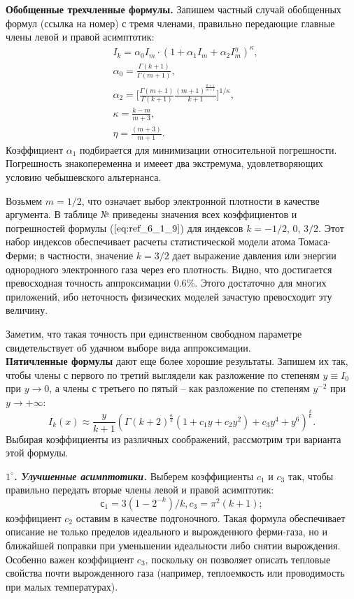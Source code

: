 \textbf{Обобщенные трехчленные формулы.} Запишем частный случай обобщенных формул (ссылка на номер) с тремя членами, правильно передающие главные члены левой и правой асимптотик:
\begin{equation}
\begin{aligned}
&I_k = \alpha_0 I_m \cdot (1 + \alpha_1 I_m + \alpha_2 I_m^{\eta})^\kappa,\\
&\alpha_0 = \frac{\Gamma(k+1)}{\Gamma(m+1)},\\
&\alpha_2 = \Bigg[\frac{\Gamma(m+1)}{\Gamma(k+1)} \frac{(m+1)^{\frac{k+1}{m+1}}}{k+1}\Bigg]^{1/{\kappa}}, \\
&\kappa = \frac{k - m}{m + 3}, \\
&\eta = \frac{(m+3)}{m+1}.
\end{aligned}
\label{eq:ref_6_1_9}
\end{equation}
Коэффициент $\alpha_1$ подбирается для минимизации относительной погрешности. Погрешность знакопеременна и имееет два экстремума, удовлетворяющих условию чебышевского альтернанса.

Возьмем $m=1/2$, что означает выбор электронной плотности в качестве аргумента. В таблице № приведены значения всех коэффициентов и погрешностей формулы ($\ref{eq:ref_6_1_9}$) для индексов $k = -1/2$, $0$, $3/2$. Этот набор индексов обеспечивает расчеты статистической модели атома Томаса-Ферми; в частности, значение $k=3/2$ дает выражение давления или энергии однородного электронного газа через его плотность. Видно, что достигается превосходная точность аппроксимации $0.6\%$. Этого достаточно для многих приложений, ибо неточность физических моделей зачастую превосходит эту величину.

Заметим, что такая точность при единственном свободном параметре свидетельствует об удачном выборе вида аппроксимации.
\\

\textbf{Пятичленные формулы} дают еще более хорошие результаты. Запишем их так, чтобы
члены с первого по третий выглядели как разложение по степеням $y \equiv I_0$ при $y \to 0$, а
члены с третьего по пятый – как разложение по степеням $y^{-2}$ при $y \to +\infty$:
\begin{equation}
I_k(x) \approx \frac{y}{k+1}(\Gamma(k+2)^{\frac{6}{k}}(1 + c_1y + c_2y^2) + c_3y^4 + y^6)^{\frac{k}{6}}.
\label{eq:ref_6_1_10}
\end{equation}
Выбирая коэффициенты из различных соображений, рассмотрим три варианта этой
формулы.

\textbf{\textit{$1^{\circ}$. Улучшенные асимптотики.}} Выберем коэффициенты $c_1$ и $c_3$ так, чтобы правильно передать вторые члены левой и правой асимптотик:
\begin{equation}
с_1 = 3 (1-2^{-k})/k,
c_3 = \pi^2 (k + 1);
\label{eq:ref_6_1_11}
\end{equation}
коэффициент $c_2$ оставим в качестве подгоночного. Такая формула обеспечивает описание
 не только пределов идеального и вырожденного ферми-газа, но и ближайшей поправки при
уменьшении идеальности либо снятии вырождения. Особенно важен коэффициент $c_3$, поскольку он позволяет описать тепловые свойства почти вырожденного газа (например, теплоемкость или проводимость при малых температурах).

